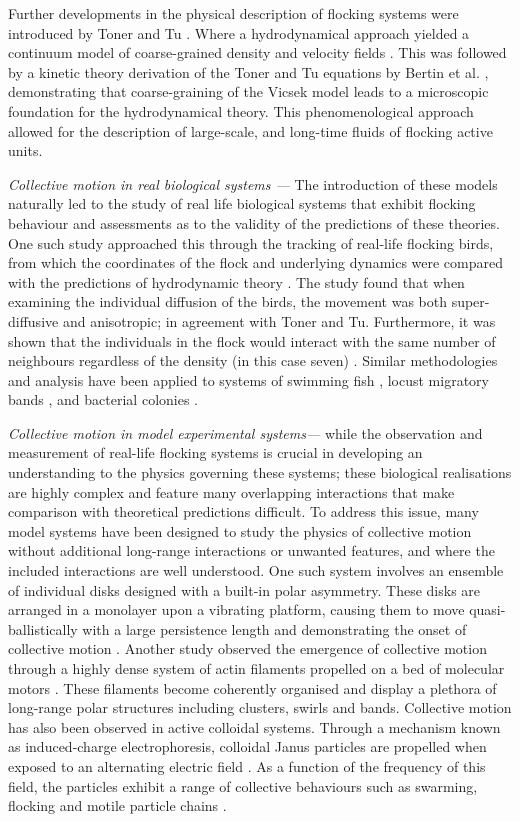 Further developments in the physical description of flocking systems were introduced by Toner and Tu \cite{toner1995,toner1998}. Where a hydrodynamical approach yielded a continuum model of coarse-grained density and velocity fields \cite{toner2005}. This was followed by a kinetic theory derivation of the Toner and Tu equations by Bertin et al. \cite{bertin2006}, demonstrating that coarse-graining of the Vicsek model leads to a microscopic foundation for the hydrodynamical theory. This phenomenological approach allowed for the description of large-scale, and long-time fluids of flocking active units.




\textit{Collective motion in real biological systems ---} The introduction of these models naturally led to the study of real life biological systems that exhibit flocking behaviour and assessments as to the validity of the predictions of these theories.  
One such study approached this through the tracking of real-life flocking birds, from which the coordinates of the flock and underlying dynamics were compared with the predictions of hydrodynamic theory \cite{cavagna2014}. The study found that when examining the individual diffusion of the birds, the movement was both super-diffusive and anisotropic; in agreement with Toner and Tu. Furthermore, it was shown that the individuals in the flock would interact with the same number of neighbours regardless of the density (in this case seven) \cite{ballerini2008}. Similar methodologies and analysis have been applied to systems of swimming fish \cite{gautrais2009}, locust migratory bands \cite{bazazi2008}, and bacterial colonies \cite{zhang2010b}.


\textit{Collective motion in model experimental systems---} while the observation and measurement of real-life flocking systems is crucial in developing an understanding to the physics governing these systems; these biological realisations are highly complex and feature many overlapping interactions that make comparison with theoretical predictions difficult. To address this issue, many model systems have been designed to study the physics of collective motion without additional long-range interactions or unwanted features, and where the included interactions are well understood. 
One such system involves an ensemble of individual disks designed with a built-in polar asymmetry. These disks are arranged in a monolayer upon a vibrating platform, causing them to move quasi-ballistically with a large persistence length and demonstrating the onset of collective motion \cite{deseigne2010}. Another study observed the emergence of collective motion through a highly dense system of actin filaments propelled on a bed of molecular motors \cite{schaller2010}. These filaments become coherently organised and display a plethora of long-range polar structures including clusters, swirls and bands.
Collective motion has also been observed in active colloidal systems. 
Through a mechanism known as induced-charge electrophoresis, colloidal Janus particles are propelled when exposed to an alternating electric field \cite{gangwal2008}. As a function of the frequency of this field, the particles exhibit a range of collective behaviours such as swarming, flocking and motile particle chains \cite{yan2016}.


